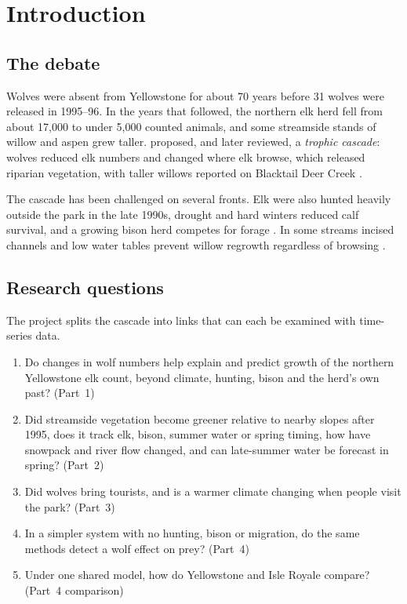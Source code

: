 \documentclass[11pt,a4paper]{article}
\begin{document}
\tableofcontents
\newpage

\section{Introduction}

\subsection{The debate}
Wolves were absent from Yellowstone for about 70 years before 31 wolves were released in 1995--96. In the years that followed, the northern elk herd fell from about 17{,}000 to under 5{,}000 counted animals, and some streamside stands of willow and aspen grew taller. \citet{ripple2004} proposed, and \citet{ripple2012} later reviewed, a \emph{trophic cascade}: wolves reduced elk numbers and changed where elk browse, which released riparian vegetation, with taller willows reported on Blacktail Deer Creek \citep{beschta2007}.

The cascade has been challenged on several fronts. Elk were also hunted heavily outside the park in the late 1990s, drought and hard winters reduced calf survival, and a growing bison herd competes for forage \citep{macnulty2016,eberhardt2007}. In some streams incised channels and low water tables prevent willow regrowth regardless of browsing \citep{bilyeu2008,marshall2013,hobbs2024}.

\subsection{Research questions}
The project splits the cascade into links that can each be examined with time-series data.
\begin{enumerate}[label=\textbf{RQ\arabic*.}]
\item Do changes in wolf numbers help explain and predict growth of the northern Yellowstone elk count, beyond climate, hunting, bison and the herd's own past? (Part~1)
\item Did streamside vegetation become greener relative to nearby slopes after 1995, does it track elk, bison, summer water or spring timing, how have snowpack and river flow changed, and can late-summer water be forecast in spring? (Part~2)
\item Did wolves bring tourists, and is a warmer climate changing when people visit the park? (Part~3)
\item In a simpler system with no hunting, bison or migration, do the same methods detect a wolf effect on prey? (Part~4)
\item Under one shared model, how do Yellowstone and Isle Royale compare? (Part~4 comparison)
\end{enumerate}
\end{document}
